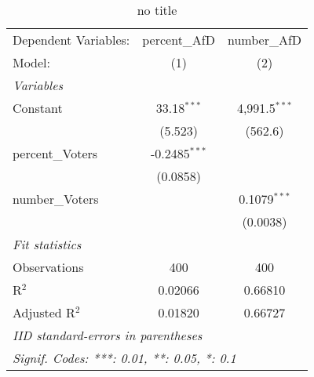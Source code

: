 \begin{table}[htbp]
   \caption{no title}
   \centering
   \begin{tabular}{lcc}
      \tabularnewline \midrule \midrule
      Dependent Variables: & percent\_AfD    & number\_AfD\\   
      Model:               & (1)             & (2)\\  
      \midrule
      \emph{Variables}\\
      Constant             & 33.18$^{***}$   & 4,991.5$^{***}$\\   
                           & (5.523)         & (562.6)\\   
      percent\_Voters      & -0.2485$^{***}$ &   \\   
                           & (0.0858)        &   \\   
      number\_Voters       &                 & 0.1079$^{***}$\\   
                           &                 & (0.0038)\\   
      \midrule
      \emph{Fit statistics}\\
      Observations         & 400             & 400\\  
      R$^2$                & 0.02066         & 0.66810\\  
      Adjusted R$^2$       & 0.01820         & 0.66727\\  
      \midrule \midrule
      \multicolumn{3}{l}{\emph{IID standard-errors in parentheses}}\\
      \multicolumn{3}{l}{\emph{Signif. Codes: ***: 0.01, **: 0.05, *: 0.1}}\\
   \end{tabular}
\end{table}